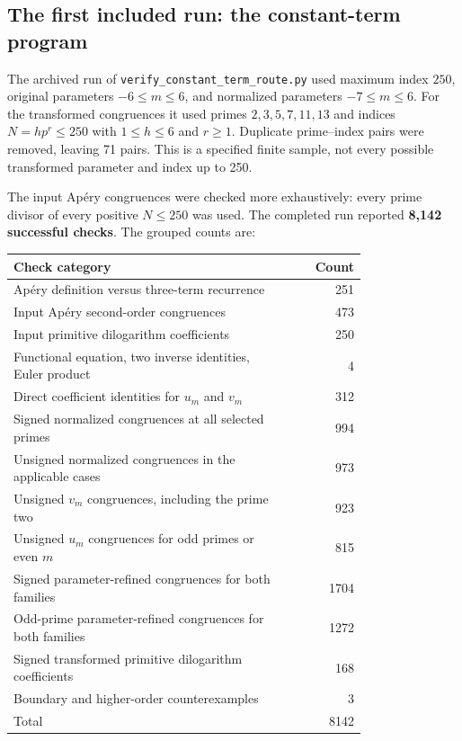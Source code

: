 \documentclass[11pt,letterpaper]{article}
\numberwithin{equation}{section}
\theoremstyle{definition}
\begin{document}
\subsection{The first included run: the constant-term program}

The archived run of \texttt{verify\_constant\_term\_route.py}
used maximum index $250$, original parameters
$-6\leq m\leq6$, and normalized parameters $-7\leq m\leq6$.
For the transformed congruences it used primes
$2,3,5,7,11,13$ and indices $N=hp^r\leq250$ with
$1\leq h\leq6$ and $r\geq1$. Duplicate prime--index pairs were removed,
leaving 71 pairs. This is a specified finite sample, not every possible
transformed parameter and index up to 250.

The input Ap\'ery congruences were checked more exhaustively: every prime
divisor of every positive $N\leq250$ was used. The completed run reported
\textbf{8,142 successful checks}. The grouped counts are:
\begin{center}
\small
\begin{tabular}{p{0.78\linewidth}r}
\toprule
Check category & Count\\
\midrule
Ap\'ery definition versus three-term recurrence & 251\\
Input Ap\'ery second-order congruences & 473\\
Input primitive dilogarithm coefficients & 250\\
Functional equation, two inverse identities, Euler product & 4\\
Direct coefficient identities for $u_m$ and $v_m$ & 312\\
Signed normalized congruences at all selected primes & 994\\
Unsigned normalized congruences in the applicable cases & 973\\
Unsigned $v_m$ congruences, including the prime two & 923\\
Unsigned $u_m$ congruences for odd primes or even $m$ & 815\\
Signed parameter-refined congruences for both families & 1704\\
Odd-prime parameter-refined congruences for both families & 1272\\
Signed transformed primitive dilogarithm coefficients & 168\\
Boundary and higher-order counterexamples & 3\\
\midrule
Total & 8142\\
\bottomrule
\end{tabular}
\end{center}
\end{document}
